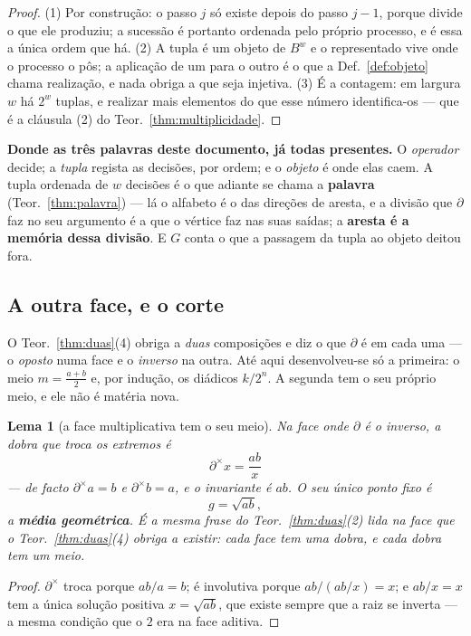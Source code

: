 \documentclass[11pt,a4paper]{article}
\newtheorem{lema}[teorema]{Lema}
\begin{document}
\begin{proof}
(1) Por construção: o passo $j$ só existe depois do passo $j-1$, porque divide o
que ele produziu; a sucessão é portanto ordenada pelo próprio processo, e é
essa a única ordem que há. (2) A tupla é um objeto de $B^{w}$ e o representado
vive onde o processo o pôs; a aplicação de um para o outro é o que a
Def.~\ref{def:objeto} chama realização, e nada obriga a que seja injetiva. (3) É
a contagem: em largura $w$ há $2^{w}$ tuplas, e realizar mais elementos do que
esse número identifica-os --- que é a cláusula (2) do
Teor.~\ref{thm:multiplicidade}.
\end{proof}

\medskip\noindent\textbf{Donde as três palavras deste documento, já todas
presentes.} O \emph{operador} decide; a \emph{tupla} regista as decisões, por
ordem; e o \emph{objeto} é onde elas caem. A tupla ordenada de $w$ decisões é o
que adiante se chama a \textbf{palavra} (Teor.~\ref{thm:palavra}) --- lá o
alfabeto é o das direções de aresta, e a divisão que $\partial$ faz no seu
argumento é a que o vértice faz nas suas saídas; a \textbf{aresta é a memória dessa
divisão}. E $G$ conta o que a passagem da tupla ao objeto deitou fora.

\subsection*{A outra face, e o corte}

\noindent O Teor.~\ref{thm:duas}(4) obriga a \emph{duas} composições e diz o
que $\partial$ é em cada uma --- o \emph{oposto} numa face e o \emph{inverso} na
outra. Até aqui desenvolveu-se só a primeira: o meio $m=\tfrac{a+b}{2}$ e, por
indução, os diádicos $k/2^{n}$. A segunda tem o seu próprio meio, e ele não é
matéria nova.

\begin{lema}[a face multiplicativa tem o seu meio]\label{lem:geo}
Na face onde $\partial$ é o inverso, a dobra que troca os extremos é
\[
\boxed{\;\partial^{\times}x=\frac{ab}{x}\;}
\]
--- de facto $\partial^{\times}a=b$ e $\partial^{\times}b=a$, e o invariante é
$ab$. O seu único ponto fixo é
\[
g=\sqrt{ab},
\]
a \textbf{média geométrica}. É a mesma frase do Teor.~\ref{thm:duas}(2) lida na
face que o Teor.~\ref{thm:duas}(4) obriga a existir: cada face tem uma dobra, e
cada dobra tem um meio.
\end{lema}

\begin{proof}
$\partial^{\times}$ troca porque $ab/a=b$; é involutiva porque $ab/(ab/x)=x$; e
$ab/x=x$ tem a única solução positiva $x=\sqrt{ab}$, que existe sempre que a
raiz se inverta --- a mesma condição que o $2$ era na face aditiva.
\end{proof}
\end{document}
